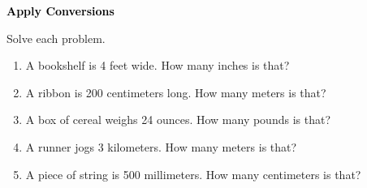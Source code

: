 \documentclass[12pt, letterpaper, fleqn]{article}
\begin{document}
\newpage

\begin{tcolorbox}[colback=customteal!20]
\large\textcolor{black}{\textbf{Apply Conversions}}
\end{tcolorbox}

\noindent
Solve each problem.

\vspace{3mm}

\begin{enumerate}[itemsep=1.8cm, leftmargin=0.6cm]

\item A bookshelf is 4 feet wide. How many inches is that?

\vspace{1.2cm}

\item A ribbon is 200 centimeters long. How many meters is that?

\vspace{1.2cm}

\item A box of cereal weighs 24 ounces. How many pounds is that?

\vspace{1.2cm}

\item A runner jogs 3 kilometers. How many meters is that?

\vspace{1.2cm}

\item A piece of string is 500 millimeters. How many centimeters is that?

\vspace{1.2cm}

\end{enumerate}
\end{document}
